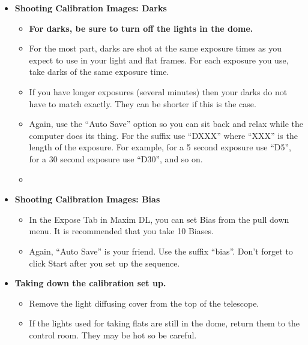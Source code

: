 \documentclass[letterpaper, 12pt]{report}
\begin{document}
	\begin{itemize}
		\item  {\large \textbf{Shooting Calibration Images: Darks}}
		\begin{itemize}
			\item \textbf{For darks, be sure to turn off the lights in the dome.}
			\item For the most part, darks are shot at the same exposure times as you expect to use in your light and flat frames. For each exposure you use, take darks of the same exposure time.
			\item If you have longer exposures (several minutes) then your darks do not have to match exactly. They can be shorter if this is the case.
			\item Again, use the ``Auto Save'' option so you can sit back and relax while the computer does its thing. For the suffix use ``DXXX'' where ``XXX'' is the length of the exposure. For example, for a 5 second exposure use ``D5'', for a 30 second exposure use ``D30'', and so on.
			\item
		\end{itemize}
		\item {\large \textbf{Shooting Calibration Images: Bias}}
		\begin{itemize}
			\item In the Expose Tab in Maxim DL, you can set Bias from the pull down menu. It is recommended that you take 10 Biases.
			\item Again, ``Auto Save'' is your friend. Use the suffix ``bias''. Don't forget to click Start after you set up the sequence.
		\end{itemize}
		\item {\large \textbf{Taking down the calibration set up.}}
		\begin{itemize}
			\item Remove the light diffusing cover from the top of the telescope.
			\item If the lights used for taking flats are still in the dome, return them to the control room. They may be hot so be careful.
	\end{itemize}

\end{itemize}
\newpage
\end{document}
